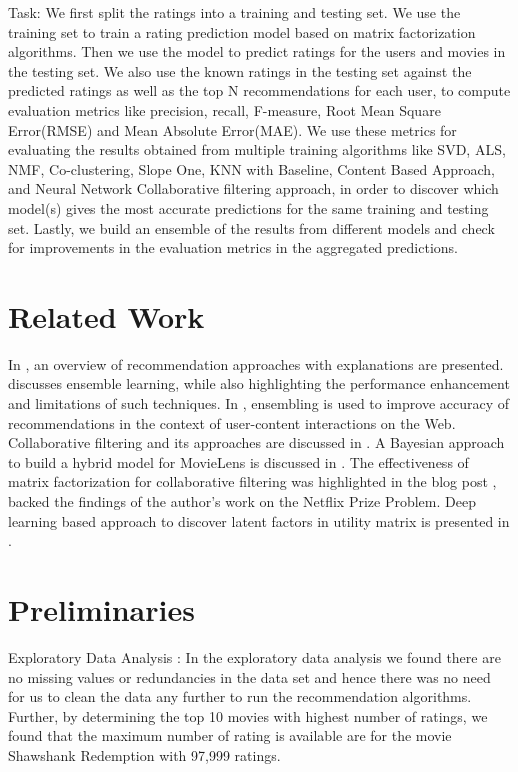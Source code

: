 \documentclass[sigconf]{acmart}
\begin{document}
Task:
We first split the ratings into a training and testing set. We use the training set to train a rating prediction model based on matrix factorization algorithms. Then we use the model to predict ratings for the users and movies in the testing set. We also use the known ratings in the testing set against the predicted ratings as well as the top N recommendations for each user, to compute evaluation metrics like precision, recall, F-measure, Root Mean Square Error(RMSE) and Mean Absolute Error(MAE). We use these metrics for evaluating the results obtained from multiple training algorithms like SVD, ALS, NMF, Co-clustering, Slope One, KNN with Baseline, Content Based Approach, and Neural Network Collaborative filtering approach, in order to discover which model(s) gives the most accurate predictions for the same training and testing set. Lastly, we build an ensemble of the results from different models and check for improvements in the evaluation metrics in the aggregated predictions.


\section{Related Work}\label{sec:related}
In \cite{Terveen01beyondrecommender}, an overview of recommendation approaches with explanations are presented. \cite{Opitz_1999} discusses ensemble learning, while also highlighting the performance enhancement and limitations of such techniques. In \cite{inproceedings}, ensembling is used to improve accuracy of recommendations in the context of user-content interactions on the Web. Collaborative filtering and its approaches are discussed in \cite{article}. A Bayesian approach to build a hybrid model for MovieLens is discussed in \cite{DECAMPOS2010785}. The effectiveness of matrix factorization for collaborative filtering was highlighted in the blog post \cite{netflix}, backed the findings of the author's work on the Netflix Prize Problem. Deep learning based approach to discover latent factors in utility matrix is presented in \cite{UNGER2016165}.


\section{Preliminaries}\label{sec:preliminary}
Exploratory Data Analysis :
In the exploratory data analysis we found there are no missing values or redundancies in the data set and hence there was no need for us to clean the data any further to run the recommendation algorithms. Further, by determining the top 10 movies with highest number of ratings, we found that the maximum number of rating is available are for the movie Shawshank Redemption with 97,999 ratings.
\end{document}
